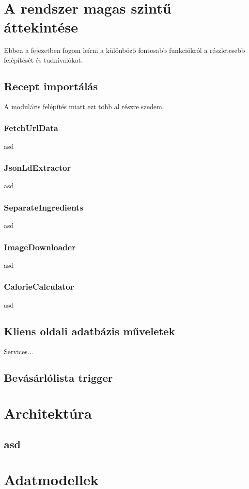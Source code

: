 \documentclass[12pt]{report}
\theoremstyle{definition}
\begin{document}
\chapter{A rendszer magas szintű áttekintése}
Ebben a fejezetben fogom leírni a különböző fontosabb funkciókról a részletesebb felépítését és tudnivalókat.

\section{Recept importálás}
A moduláris felépítés miatt ezt több al részre szedem.

\subsection{FetchUrlData}
asd
\subsection{JsonLdExtractor}
asd
\subsection{SeparateIngredients}
asd
\subsection{ImageDownloader} 
asd
\subsection{CalorieCalculator}
asd
\section{Kliens oldali adatbázis műveletek}
Services...

\section{Bevásárlólista trigger}

\chapter{Architektúra}
\section{asd}


\chapter{Adatmodellek}
\end{document}
